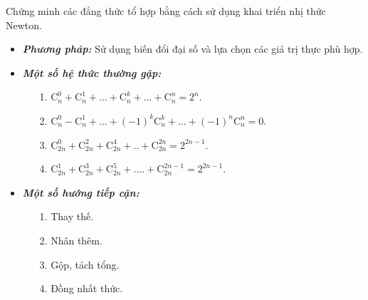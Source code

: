 \begin{dang}{Chứng minh các đẳng thức tổ hợp bằng cách sử dụng khai triển nhị thức Newton.} %
    \begin{itemize}
        \item \textbf{\textit{Phương pháp: }} Sử dụng biến đổi đại số và lựa chọn các giá trị thực phù hợp.
        \item \textbf{\textit{Một số hệ thức thường gặp: }}
        \begin{itemize}
            \item[1.] $\mathrm{C}_n^0+\mathrm{C}_n^1+...+\mathrm{C}_n^k+...+\mathrm{C}_n^n=2^n$. 
            \item[2.] $\mathrm{C}_n^0-\mathrm{C}_n^1+...+(-1)^k\mathrm{C}_n^k+...+(-1)^n\mathrm{C}_n^n=0$.
            \item[3.] $\mathrm{C}_{2n}^0+\mathrm{C}_{2n}^2+\mathrm{C}_{2n}^4+..+\mathrm{C}_{2n}^{2n}=2^{2n-1}$.
            \item[4.] $\mathrm{C}_{2n}^1+\mathrm{C}_{2n}^3+\mathrm{C}_{2n}^5+....+\mathrm{C}_{2n}^{2n-1}=2^{2n-1}$.
        \end{itemize}
        \item \textbf{\textit{Một số hướng tiếp cận: }}
        \begin{itemize}
            \item[1.] Thay thế.
            \item[2.] Nhân thêm.
            \item[3.] Gộp, tách tổng.
            \item[4.] Đồng nhất thức.
        \end{itemize}
    \end{itemize}
\end{dang}

